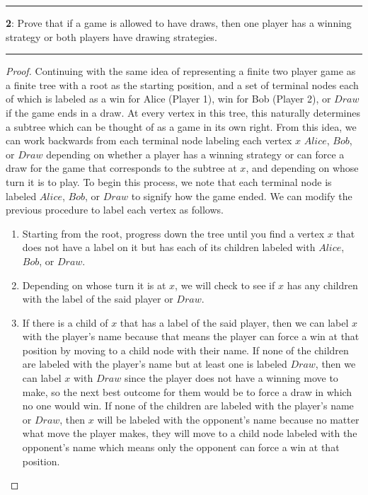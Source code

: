 \documentclass[11pt]{article}
\newcommand\question[2]{\vspace{.25in}\hrule\textbf{#1}: #2\vspace{.5em}\hrule\vspace{.10in}}
\begin{document}
\question{2}{Prove that if a game is allowed to have draws, then one player has a winning strategy or both players have drawing strategies.}
\begin{proof}
	Continuing with the same idea of representing a finite two player game as a finite tree with a root as the starting position, and a set of terminal nodes each of which is labeled as a win for Alice (Player 1), win for Bob (Player 2), or $Draw$ if the game ends in a draw. At every vertex in this tree, this naturally determines a subtree which can be thought of as a game in its own right. From this idea, we can work backwards from each terminal node labeling each vertex $x$ $Alice$, $Bob$, or $Draw$ depending on whether a player has a winning strategy or can force a draw for the game that corresponds to the subtree at $x$, and depending on whose turn it is to play. 
	To begin this process, we note that each terminal node is labeled $Alice$, $Bob$, or $Draw$ to signify how the game ended. We can modify the previous procedure to label each vertex as follows.
	\begin{enumerate}
		\item Starting from the root, progress down the tree until you find a vertex $x$ that does not have a label on it but has each of its children labeled with $Alice$, $Bob$, or $Draw$.
		\item Depending on whose turn it is at $x$, we will check to see if $x$ has any children with the label of the said player or $Draw$.
		\item If there is a child of $x$ that has a label of the said player, then we can label $x$ with the player's name because that means the player can force a win at that position by moving to a child node with their name. If none of the children are labeled with the player's name but at least one is labeled $Draw$, then we can label $x$ with $Draw$ since the player does not have a winning move to make, so the next best outcome for them would be to force a draw in which no one would win. If none of the children are labeled with the player's name or $Draw$, then $x$ will be labeled with the opponent's name because no matter what move the player makes, they will move to a child node labeled with the opponent's name which means only the opponent can force a win at that position.
	\end{enumerate}

\end{proof}
\end{document}
